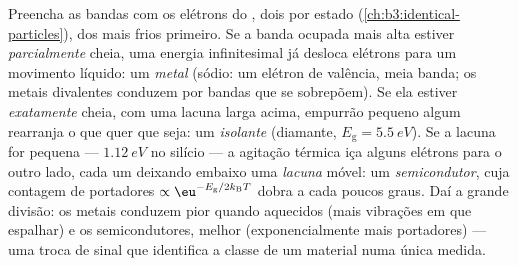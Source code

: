 \begin{definition}\label{def:b3:electrons-in-solids:classes}
Preencha as bandas com os elétrons do , dois por estado
(\cref{ch:b3:identical-particles}), dos mais frios primeiro. Se a banda
ocupada mais alta estiver \emph{parcialmente} cheia, uma energia
infinitesimal já desloca elétrons para um movimento líquido: um
\emph{metal} (sódio: um elétron de valência, meia banda; os metais
divalentes conduzem por bandas que se sobrepõem). Se ela estiver
\emph{exatamente} cheia, com uma lacuna larga acima, empurrão pequeno
algum rearranja o que quer que seja: um \emph{isolante}
(diamante, $E_{\text{g}} = \qty{5.5}{eV}$). Se a lacuna for pequena ---
$\qty{1.12}{eV}$ no silício --- a agitação térmica iça alguns
elétrons para o outro lado, cada um deixando embaixo uma \emph{lacuna}
móvel: um \emph{semicondutor}, cuja contagem de portadores
$\propto\eu^{-E_{\text{g}}/2k_{\text{B}}T}$ dobra a cada poucos
graus. Daí a grande divisão: os metais conduzem pior quando aquecidos
(mais vibrações em que espalhar) e os semicondutores, melhor
(exponencialmente mais portadores) --- uma troca de sinal que
identifica a classe de um material numa única medida.
\end{definition}

